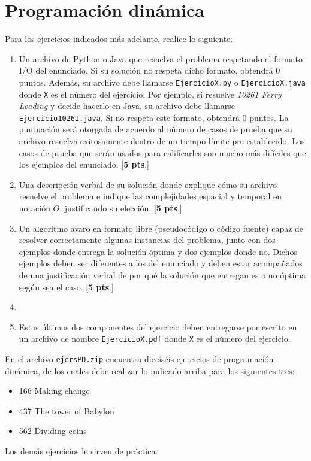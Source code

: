 \documentclass{amsart}
\begin{document}
%

\section{Programación dinámica}
Para los ejercicios indicados más adelante, realice lo siguiente.
\begin{enumerate}
	\item Un archivo de Python o Java que resuelva el problema respetando el formato I/O del enunciado. Si su solución no respeta dicho formato, obtendrá 0 puntos. Además, su archivo debe llamarse \texttt{EjercicioX.py} o \texttt{EjercicioX.java} donde \texttt{X} es el número del ejercicio. Por ejemplo, si resuelve \emph{10261 Ferry Loading} y decide hacerlo en Java, su archivo debe llamarse \texttt{Ejercicio10261.java}. Si no respeta este formato, obtendrá 0 puntos. La puntuación será otorgada de acuerdo al número de casos de prueba que su archivo resuelva exitosamente dentro de un tiempo límite pre-establecido. Los casos de prueba que serán usados para calificarles son mucho más difíciles que los ejemplos del enunciado. [\textbf{5 pts}.]
	\item Una descripción verbal de su solución donde explique cómo su archivo resuelve el problema e indique las complejidades espacial y temporal en notación $O$, justificando su elección. [\textbf{5 pts}.]
	\item Un algoritmo avaro en formato libre (pseudocódigo o código fuente) capaz de resolver correctamente algunas instancias del problema, junto con dos ejemplos donde entrega la solución óptima y dos ejemplos donde no. Dichos ejemplos deben ser diferentes a los del enunciado y deben estar acompañados de una justificación verbal de por qué la solución que entregan es o no óptima según sea el caso. [\textbf{5 pts}.]
	\item[]
	\item[] Estos últimos dos componentes del ejercicio deben entregarse por escrito en un archivo de nombre \texttt{EjercicioX.pdf} donde \texttt{X} es el número del ejercicio.
\end{enumerate}

\bigskip
En el archivo \texttt{ejersPD.zip} encuentra dieciséis ejercicios de programación dinámica, de los cuales debe realizar lo indicado arriba para los siguientes tres:
\begin{itemize}
	\item 166 Making change
	\item 437 The tower of Babylon
	\item 562 Dividing coins
\end{itemize}
Los demás ejercicios le sirven de práctica.
\end{document}
